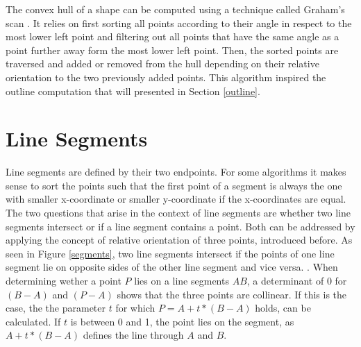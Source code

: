 The convex hull of a shape can be computed using a technique called Graham's scan \cite[Chapter~33]{cormen09}. It relies on first sorting all points according to their angle in respect to the most lower left point and filtering out all points that have the same angle as a point further away form the most lower left point. Then, the sorted points are traversed and added or removed from the hull depending on their relative orientation to the two previously added points. This algorithm inspired the outline computation that will presented in Section \ref{outline}.
\section{Line Segments}


Line segments are defined by their two endpoints. For some algorithms it makes sense to sort the points such that the first point of a segment is always the one with smaller x-coordinate or smaller y-coordinate if the x-coordinates are equal. The two questions that arise in the context of line segments are whether two line segments intersect or if a line segment contains a point. Both can be addressed by applying the concept of relative orientation of three points, introduced before. As seen in Figure \ref{segments}, two line segments intersect if the points of one line segment lie on opposite sides of the other line segment and vice versa. \cite[Chapter~33]{cormen09}. When determining wether a point $P$ lies on a line segments $AB$, a determinant of 0 for $(B-A)$ and $(P-A)$ shows that the three points are collinear. If this is the case, the the parameter $t$ for which $P = A + t*(B-A)$ holds, can be calculated. If $t$ is between 0 and 1, the point lies on the segment, as $A + t*(B-A)$ defines the line through $A$ and $B$.

